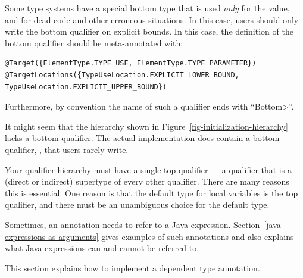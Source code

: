 
Some type systems have a special bottom type that is used \emph{only} for
the  value, and for dead code and other erroneous situations.
In this case, users should only write the bottom qualifier on explicit
bounds.  In this case, the definition of the bottom qualifier should be
meta-annotated with:

%
\begin{Verbatim}
@Target({ElementType.TYPE_USE, ElementType.TYPE_PARAMETER})
@TargetLocations({TypeUseLocation.EXPLICIT_LOWER_BOUND, TypeUseLocation.EXPLICIT_UPPER_BOUND})
\end{Verbatim}

Furthermore, by convention the name of such a qualifier ends with ``\<Bottom>''.

It might seem that the hierarchy shown in Figure~\ref{fig-initialization-hierarchy} lacks
a bottom qualifier.  The actual implementation does contain a bottom
qualifier, , that
users rarely write.


Your qualifier hierarchy must have a single top qualifier
--- a qualifier that is a (direct or indirect) supertype of every other
qualifier.
There are many reasons this is essential.
One reason is that the default type for local variables is the top
qualifier, and there must be an unambiguous choice for the default type.



Sometimes, an annotation needs to refer to a Java expression.
Section~\ref{java-expressions-as-arguments} gives examples of such
annotations and also explains what Java expressions can and cannot be
referred to.

This section explains how to implement a dependent type annotation.

